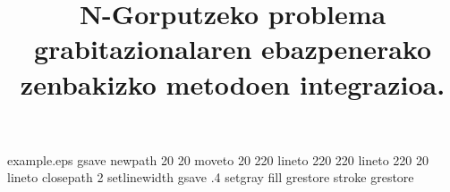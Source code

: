 %
%
%
%
%
\begin{filecontents*}{example.eps}
gsave
newpath
  20 20 moveto
  20 220 lineto
  220 220 lineto
  220 20 lineto
closepath
2 setlinewidth
gsave
  .4 setgray fill
grestore
stroke
grestore
\end{filecontents*}
%
\RequirePackage{fix-cm}
%
\documentclass[smallextended]{svjour3}       %
%
\smartqed  %
%
\usepackage{graphicx}
%
%
%
%
%
\usepackage[utf8]{inputenc}
\usepackage[english]{babel}
\graphicspath{ {images/} }
\usepackage{listings}   %
\usepackage{algorithm2e}
\renewcommand{\algorithmcfname}{ALGORITHM}
\usepackage {amsmath,amsfonts,amssymb}
\usepackage{subfig}


\title{N-Gorputzeko problema grabitazionalaren ebazpenerako zenbakizko metodoen integrazioa.%
}


